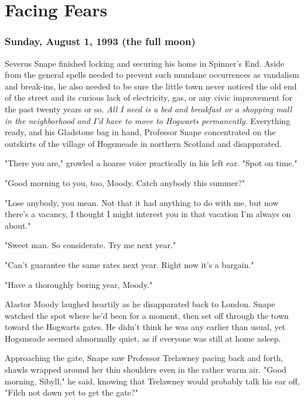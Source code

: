 
\chapter{Facing Fears}

\subsection{Sunday, August 1, 1993 (the full moon)}

Severus Snape finished locking and securing his home in Spinner's End. Aside from the general spells needed to prevent such mundane occurrences as vandalism and break-ins, he also needed to be sure the little town never noticed the old end of the street and its curious lack of electricity, gas, or any civic improvement for the past twenty years or so. \emph{All I need is a bed and breakfast or a shopping mall in the neighborhood and I'd have to move to Hogwarts permanently.} Everything ready, and his Gladstone bag in hand, Professor Snape concentrated on the outskirts of the village of Hogsmeade in northern Scotland and disapparated.

"There you are," growled a hoarse voice practically in his left ear. "Spot on time."

"Good morning to you, too, Moody. Catch anybody this summer?"

"Lose anybody, you mean. Not that it had anything to do with me, but now there's a vacancy, I thought I might interest you in that vacation I'm always on about."

"Sweet man. So considerate. Try me next year."

"Can't guarantee the same rates next year. Right now it's a bargain."

"Have a thoroughly boring year, Moody."

Alastor Moody laughed heartily as he disapparated back to London. Snape watched the spot where he'd been for a moment, then set off through the town toward the Hogwarts gates. He didn't think he was any earlier than usual, yet Hogsmeade seemed abnormally quiet, as if everyone was still at home asleep.

Approaching the gate, Snape saw Professor Trelawney pacing back and forth, shawls wrapped around her thin shoulders even in the rather warm air. "Good morning, Sibyll," he said, knowing that Trelawney would probably talk his ear off, "Filch not down yet to get the gate?"

